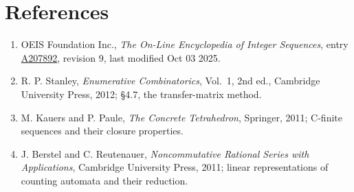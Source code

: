 \documentclass[11pt]{article}
\theoremstyle{definition}
\begin{document}
\section{References}

\begin{enumerate}

\item OEIS Foundation Inc., \emph{The On-Line Encyclopedia of Integer Sequences}, entry \href{https://oeis.org/A207892}{A207892}, revision 9, last modified Oct 03 2025.

\item R. P. Stanley, \emph{Enumerative Combinatorics}, Vol.~1, 2nd ed., Cambridge University Press, 2012; \S4.7, the transfer-matrix method.

\item M. Kauers and P. Paule, \emph{The Concrete Tetrahedron}, Springer, 2011; C-finite sequences and their closure properties.

\item J. Berstel and C. Reutenauer, \emph{Noncommutative Rational Series with Applications}, Cambridge University Press, 2011; linear representations of counting automata and their reduction.

\end{enumerate}
\end{document}
